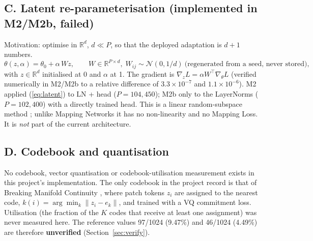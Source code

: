 \documentclass[10pt,a4paper]{article}
\newcommand{\Unv}{\textcolor{fail}{\textbf{unverified}}}
\begin{document}
\subsection{C. Latent re-parameterisation (implemented in M2/M2b, failed)}\label{sec:latent-math}
Motivation: optimise in \(\mathbb{R}^d\), \(d\ll P\), so that the deployed adaptation is \(d+1\) numbers.
\begin{equation}\label{eq:latent}
\theta(z,\alpha)=\theta_0+\alpha\,Wz,\qquad W\in\mathbb{R}^{P\times d},\;W_{ij}\sim\mathcal{N}(0,1/d)\ \text{(regenerated from a seed, never stored)},
\end{equation}
with \(z\in\mathbb{R}^d\) initialised at 0 and \(\alpha\) at 1. The gradient is
\(\nabla_z L=\alpha W^\top\nabla_\theta L\) (verified numerically in M2/M2b to a relative difference of
\(3.3\times10^{-7}\) and \(1.1\times10^{-6}\)). M2 applied (\ref{eq:latent}) to LN + head
(\(P=104{,}450\)); M2b only to the LayerNorms (\(P=102{,}400\)) with a directly trained head. This is
a linear random-subspace method \cite{li2018intrinsic}; unlike Mapping Networks \cite{sen2026mapping}
it has no non-linearity and no Mapping Loss. It is \emph{not} part of the current architecture.

\subsection{D. Codebook and quantisation}\label{sec:codebook}
No codebook, vector quantisation or codebook-utilisation measurement exists in this project's
implementation. The only codebook in the project record is that of Breaking Manifold Continuity
\cite{wang2026breaking}, where patch tokens \(z_i\) are assigned to the nearest code,
\(k(i)=\arg\min_k\|z_i-e_k\|\), and trained with a VQ commitment loss. Utilisation (the fraction of
the \(K\) codes that receive at least one assignment) was never measured here. The reference values
97/1024 (9.47\%) and 46/1024 (4.49\%) are therefore \Unv{} (Section~\ref{sec:verify}).
\end{document}
